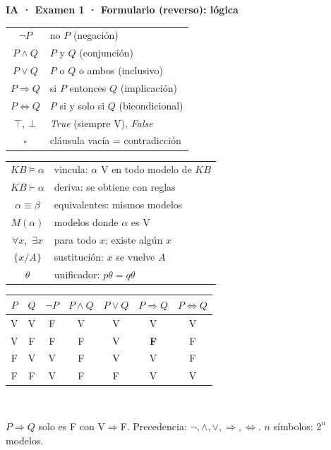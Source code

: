 \documentclass[10pt,a4paper]{extarticle}
\newcommand{\imp}{\Rightarrow}\newcommand{\sii}{\Leftrightarrow}
\begin{document}
\newpage
{\large\bfseries\color{azul} IA · Examen 1 · Formulario (reverso): lógica}\par\vspace{2pt}
\begin{tcolorbox}[colback=azulclaro,colframe=azul,boxrule=0.5pt,arc=1pt,left=3pt,right=3pt,top=2pt,bottom=2pt,
  title={\bfseries SÍMBOLOS Y CÓMO SE LEEN \hfill TABLA DE VERDAD},fonttitle=\footnotesize,colbacktitle=azul,toptitle=0pt,bottomtitle=0pt]
\footnotesize
\begin{minipage}[t]{0.33\linewidth}
\begin{tabular}{@{}c@{\;\;}l@{}}
$\neg P$ & no $P$ (negación)\\
$P\wedge Q$ & $P$ y $Q$ (conjunción)\\
$P\vee Q$ & $P$ o $Q$ o ambos (inclusivo)\\
$P\imp Q$ & si $P$ entonces $Q$ (implicación)\\
$P\sii Q$ & $P$ si y solo si $Q$ (bicondicional)\\
$\top,\ \bot$ & \textit{True} (siempre V), \textit{False}\\
$\square$ & cláusula vacía = contradicción
\end{tabular}
\end{minipage}\hfill
\begin{minipage}[t]{0.33\linewidth}
\begin{tabular}{@{}c@{\;\;}l@{}}
$KB\models\alpha$ & vincula: $\alpha$ V en todo modelo de $KB$\\
$KB\vdash\alpha$ & deriva: se obtiene con reglas\\
$\alpha\equiv\beta$ & equivalentes: mismos modelos\\
$M(\alpha)$ & modelos donde $\alpha$ es V\\
$\forall x$,\ $\exists x$ & para todo $x$; existe algún $x$\\
$\{x/A\}$ & sustitución: $x$ se vuelve $A$\\
$\theta$ & unificador: $p\theta=q\theta$
\end{tabular}
\end{minipage}\hfill
\begin{minipage}[t]{0.31\linewidth}
\centering
\begin{tabular}{@{}cc|c@{\,}c@{\,}c@{\,}c@{\,}c@{}}
$P$ & $Q$ & $\neg P$ & $P{\wedge}Q$ & $P{\vee}Q$ & $P{\imp}Q$ & $P{\sii}Q$\\\hline
V & V & F & V & V & V & V\\
V & F & F & F & V & \textbf{F} & F\\
F & V & V & F & V & V & F\\
F & F & V & F & F & V & V
\end{tabular}\\[2pt]
\raggedright $P\imp Q$ solo es F con V$\imp$F. Precedencia: $\neg,\wedge,\vee,\imp,\sii$. $n$ símbolos: $2^n$ modelos.
\end{minipage}
\end{tcolorbox}
\end{document}

